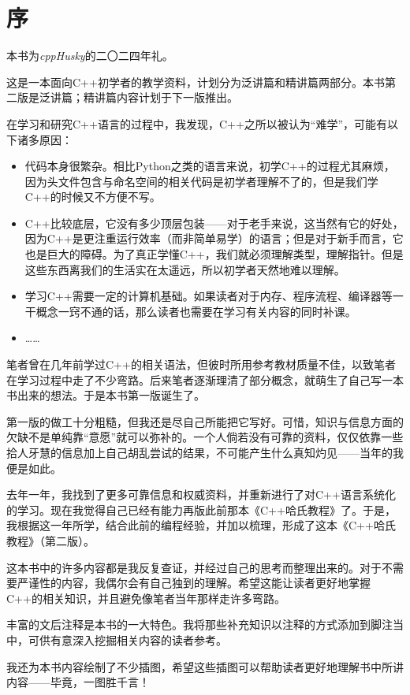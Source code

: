 \chapter{序}
本书为\textit{cppHusky}的二〇二四年礼。\par
这是一本面向C++初学者的教学资料，计划分为泛讲篇和精讲篇两部分。本书第二版是泛讲篇；精讲篇内容计划于下一版推出。\par
在学习和研究C++语言的过程中，我发现，C++之所以被认为``难学''，可能有以下诸多原因：
\begin{itemize}
    \item 代码本身很繁杂。相比Python之类的语言来说，初学C++的过程尤其麻烦，因为头文件包含与命名空间的相关代码是初学者理解不了的，但是我们学C++的时候又不方便不写。
    \item C++比较底层，它没有多少顶层包装——对于老手来说，这当然有它的好处，因为C++是更注重运行效率（而非简单易学）的语言；但是对于新手而言，它也是巨大的障碍。为了真正学懂C++，我们就必须理解类型，理解指针。但是这些东西离我们的生活实在太遥远，所以初学者天然地难以理解。
    \item 学习C++需要一定的计算机基础。如果读者对于内存、程序流程、编译器等一干概念一窍不通的话，那么读者也需要在学习有关内容的同时补课。
    \item ……
\end{itemize}\par
笔者曾在几年前学过C++的相关语法，但彼时所用参考教材质量不佳，以致笔者在学习过程中走了不少弯路。后来笔者逐渐理清了部分概念，就萌生了自己写一本书出来的想法。于是本书第一版诞生了。\par
第一版的做工十分粗糙，但我还是尽自己所能把它写好。可惜，知识与信息方面的欠缺不是单纯靠``意愿''就可以弥补的。一个人倘若没有可靠的资料，仅仅依靠一些拾人牙慧的信息加上自己胡乱尝试的结果，不可能产生什么真知灼见——当年的我便是如此。\par
去年一年，我找到了更多可靠信息和权威资料，并重新进行了对C++语言系统化的学习。现在我觉得自己已经有能力再版此前那本《C++哈氏教程》了。于是，我根据这一年所学，结合此前的编程经验，并加以梳理，形成了这本《C++哈氏教程》（第二版）。\par
这本书中的许多内容都是我反复查证，并经过自己的思考而整理出来的。对于不需要严谨性的内容，我偶尔会有自己独到的理解。希望这能让读者更好地掌握C++的相关知识，并且避免像笔者当年那样走许多弯路。\par
丰富的文后注释是本书的一大特色。我将那些补充知识以注释的方式添加到脚注当中，可供有意深入挖掘相关内容的读者参考。\par
我还为本书内容绘制了不少插图，希望这些插图可以帮助读者更好地理解书中所讲内容——毕竟，一图胜千言！\par
